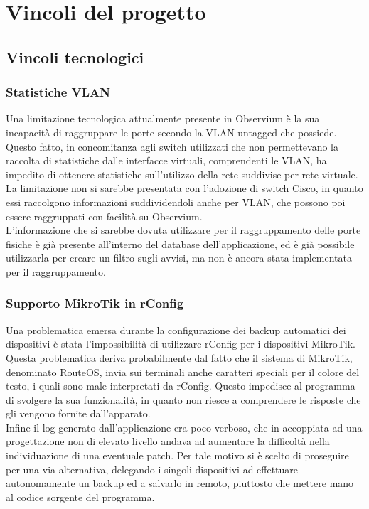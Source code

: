 \documentclass[Tesi.tex]{subfiles}
\begin{document}
\newpage
\section{Vincoli del progetto}
\subsection{Vincoli tecnologici}
\subsubsection{Statistiche VLAN}
Una limitazione tecnologica attualmente presente in Observium è la sua incapacità di raggruppare le porte secondo la VLAN untagged che possiede. \\
Questo fatto, in concomitanza agli switch utilizzati che non permettevano la raccolta di statistiche dalle interfacce virtuali, comprendenti le VLAN, ha impedito di ottenere statistiche sull'utilizzo della rete suddivise per rete virtuale. \\
La limitazione non si sarebbe presentata con l'adozione di switch Cisco, in quanto essi raccolgono informazioni suddividendoli anche per VLAN, che possono poi essere raggruppati con facilità su Observium. \\
L'informazione che si sarebbe dovuta utilizzare per il raggruppamento delle porte fisiche è già presente all'interno del database dell'applicazione, ed è già possibile utilizzarla per creare un filtro sugli avvisi, ma non è ancora stata implementata per il raggruppamento.

\subsubsection{Supporto MikroTik in rConfig}
Una problematica emersa durante la configurazione dei backup automatici dei dispositivi è stata l'impossibilità di utilizzare rConfig per i dispositivi MikroTik. \\
Questa problematica deriva probabilmente dal fatto che il sistema di MikroTik, denominato RouteOS, invia sui terminali anche caratteri speciali per il colore del testo, i quali sono male interpretati da rConfig. Questo impedisce al programma di svolgere la sua funzionalità, in quanto non riesce a comprendere le risposte che gli vengono fornite dall'apparato. \\
Infine il log generato dall'applicazione era poco verboso, che in accoppiata ad una progettazione non di elevato livello andava ad aumentare la difficoltà nella individuazione di una eventuale patch. Per tale motivo si è scelto di proseguire per una via alternativa, delegando i singoli dispositivi ad effettuare autonomamente un backup ed a salvarlo in remoto, piuttosto che mettere mano al codice sorgente del programma.
\end{document}
